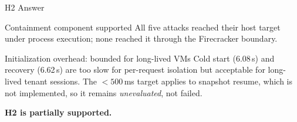 \documentclass[aspectratio=169,11pt]{beamer}
\begin{document}
\begin{frame}{H2 Answer}
  \begin{exampleblock}{Containment component supported}
    All five attacks reached their host target under process execution; none
    reached it through the Firecracker boundary.
  \end{exampleblock}
  \vspace{0.25cm}
  \begin{alertblock}{Initialization overhead: bounded for long-lived VMs}
    Cold start (6.08\,s) and recovery (6.62\,s) are too slow for per-request
    isolation but acceptable for long-lived tenant sessions. The
    $<500$\,ms target applies to snapshot resume, which is not implemented,
    so it remains \emph{unevaluated}, not failed.
  \end{alertblock}
  \vspace{0.3cm}
  \centering
  \Large\textbf{H2 is partially supported.}
\end{frame}
\end{document}

